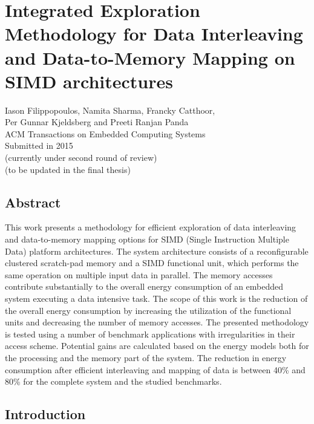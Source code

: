 \chapter{Integrated Exploration Methodology for Data Interleaving and Data-to-Memory Mapping on SIMD architectures}
\label{interleaving}

\begin{center}
Iason Filippopoulos, Namita Sharma, Francky Catthoor, \\ Per Gunnar Kjeldsberg and Preeti Ranjan Panda
\\
ACM Transactions on Embedded Computing Systems
\\
Submitted in 2015 
\\
(currently under second round of review)
\\
(to be updated in the final thesis)
\end{center}
\afterpage{\null\newpage}
\newpage

\vspace*{\fill}
\section*{\hspace*{\fill} Abstract \hspace*{\fill}}
This work presents a methodology for efficient exploration of data interleaving and data-to-memory mapping options for SIMD (Single Instruction Multiple Data) platform architectures.
The system architecture consists of  a reconfigurable clustered scratch-pad memory and a SIMD functional unit, which performs the same operation on multiple input data in parallel. 
The memory accesses contribute substantially to the overall energy consumption of an embedded system executing a data intensive task. 
The scope of this work is the reduction of the overall energy consumption by increasing the utilization of the functional units and decreasing the number of memory accesses.
The presented methodology is tested using a number of benchmark applications with irregularities in their access scheme.
Potential gains are calculated based on the energy models both for the processing and the memory part of the system.
The reduction in energy consumption after efficient interleaving and mapping of data is between 40\% and 80\% for the complete system and the studied benchmarks.
\vspace*{\fill}
\afterpage{\null\newpage}
\newpage

\section{Introduction}


